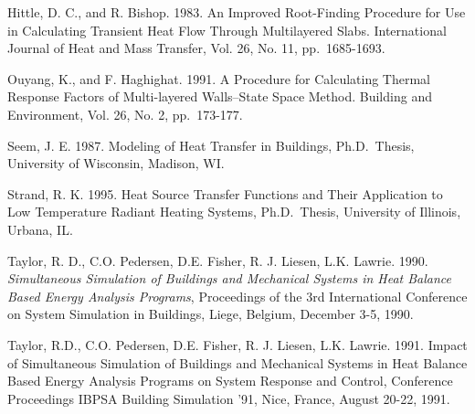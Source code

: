 Hittle, D. C., and R. Bishop. 1983. An Improved Root-Finding Procedure for Use in Calculating Transient Heat Flow Through Multilayered Slabs. International Journal of Heat and Mass Transfer, Vol. 26, No. 11, pp.~1685-1693.

Ouyang, K., and F. Haghighat. 1991. A Procedure for Calculating Thermal Response Factors of Multi-layered Walls--State Space Method. Building and Environment, Vol. 26, No. 2, pp.~173-177.

Seem, J. E. 1987. Modeling of Heat Transfer in Buildings, Ph.D.~Thesis, University of Wisconsin, Madison, WI.

Strand, R. K. 1995. Heat Source Transfer Functions and Their Application to Low Temperature Radiant Heating Systems, Ph.D.~Thesis, University of Illinois, Urbana, IL.

Taylor, R. D., C.O. Pedersen, D.E. Fisher, R. J. Liesen, L.K. Lawrie. 1990. \emph{Simultaneous Simulation of Buildings and Mechanical Systems in Heat Balance Based Energy Analysis Programs}, Proceedings of the 3rd International Conference on System Simulation in Buildings, Liege, Belgium, December 3-5, 1990.

Taylor, R.D., C.O. Pedersen, D.E. Fisher, R. J. Liesen, L.K. Lawrie. 1991. Impact of Simultaneous Simulation of Buildings and Mechanical Systems in Heat Balance Based Energy Analysis Programs on System Response and Control, Conference Proceedings IBPSA Building Simulation '91, Nice, France, August 20-22, 1991.
